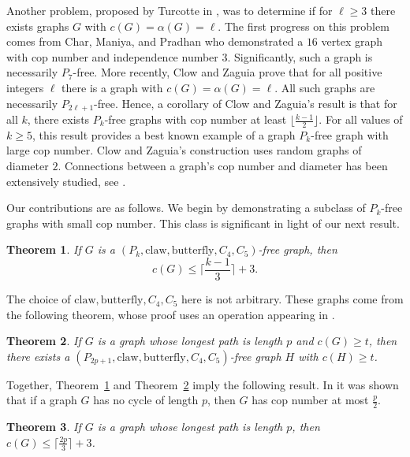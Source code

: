 \documentclass[12pt]{article}
\newtheorem{theorem}{Theorem}[section]
\theoremstyle{definition}
\def\claw{\text{claw}}
\def\butterfly{\text{butterfly}}
\begin{document}
Another problem, proposed by Turcotte in \cite{turcotte2022cops}, was to determine if for $\ell\geq 3$ there exists graphs $G$ with $c(G) = \alpha(G) = \ell$.
The first progress on this problem comes from
Char, Maniya, and Pradhan \cite{char20254} who demonstrated a $16$ vertex graph with cop number and independence number $3$.
Significantly, such a graph is necessarily $P_7$-free.
More recently, Clow and Zaguia \cite{clow2025cops} prove that for all positive integers $\ell$ there is a graph with $c(G) = \alpha(G) = \ell$.
All such graphs are necessarily $P_{2\ell+1}$-free.
Hence, a corollary of Clow and Zaguia's result is that for all $k$, there exists $P_{k}$-free graphs with cop number at least $\lfloor\frac{k-1}{2}\rfloor$.
For all values of $k\geq 5$, 
this result provides a best known example of a graph $P_k$-free graph with large cop number.
Clow and Zaguia's construction uses random graphs of diameter $2$.
Connections between a graph's cop number and diameter has been extensively studied, see \cite{lu2012meyniel,petr2023note,wagner2015cops}. 


Our contributions are as follows.
We begin by demonstrating a subclass of $P_k$-free graphs with small cop number.
This class is significant in light of our next result.

\begin{theorem}\label{Thm: path,claw,butterfly free}
    If $G$ is a $(P_k,\claw,\butterfly,C_4,C_5)$-free graph, then 
    \[
    c(G) \leq \Big\lceil \frac{k-1}{3}\Big\rceil+3.
    \] 
\end{theorem}

The choice of $\claw,\butterfly,C_4,C_5$ here is not arbitrary.
These graphs come from the following theorem, whose proof uses an operation appearing in \cite{joret2010cops}.

\begin{theorem}\label{Thm: path to claw reduction}
    If $G$ is a graph whose longest path is length $p$ and $c(G) \geq t$, then there exists a $(P_{2p+1},\claw,\butterfly,C_4,C_5)$-free graph $H$ with $c(H) \geq t$.
\end{theorem}

Together, Theorem~\ref{Thm: path,claw,butterfly free} and Theorem~\ref{Thm: path to claw reduction} imply the following result.
In \cite{joret2010cops} it was shown that if a graph $G$ has no cycle of length $p$, 
then $G$ has cop number at most $\frac{p}{2}$. 

\begin{theorem}\label{Thm: main longest path}
   If $G$ is a graph whose longest path is length $p$, then $c(G) \leq \lceil\frac{2p}{3}\rceil+3$. 
\end{theorem}
\end{document}
